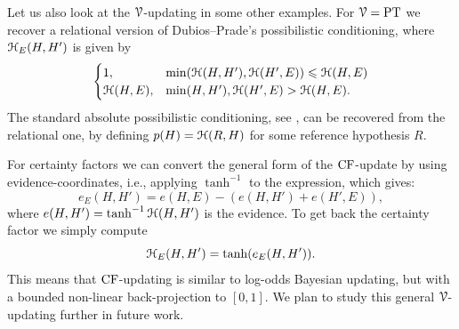 Let us also look at the $\EuScript{V}$-updating in some other examples. For $\EuScript{V} = \mathrm{PT}$ we recover a relational version of Dubios--Prade's possibilistic conditioning, where $\EuScript{H}_E(H,H')$ is given by
\[
\begin{cases}
    1, &\min(\EuScript{H}(H,H'), \EuScript{H}(H',E)) \leqslant \EuScript{H}(H,E) \\
    \EuScript{H}(H,E),  &\min(H,H'), \EuScript{H}(H',E) > \EuScript{H}(H,E).
\end{cases}
\]
The standard absolute possibilistic conditioning, see \cite{dubois-prade_1990}, can be recovered from the relational one, by defining $p(H) = \EuScript{H}(R,H)$ for some reference hypothesis $R$. 

For certainty factors we can convert the general form of the $\mathrm{CF}$-update by using evidence-coordinates, i.e., applying $\tanh^{-1}$ to the expression, which gives: 
\[e_E(H,H') = e(H,E) - (e(H,H')+e(H',E)),\]
where $e(H,H')= \tanh^{-1}\EuScript{H}(H,H')$ is the evidence. To get back the certainty factor we simply compute 
\[\EuScript{H}_E(H,H')= \tanh(e_E(H,H')).\]
This means that $\mathrm{CF}$-updating is similar to log-odds Bayesian updating, but with a bounded non-linear back-projection to $[0,1]$. We plan to study this general $\EuScript{V}$-updating further in future work. 
